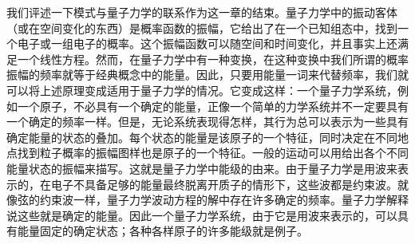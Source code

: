 我们评述一下模式与量子力学的联系作为这一章的结束。量子力学中的振动客体（或在空间变化的东西）是概率函数的振幅，它给出了在一个已知组态中，找到一个电子或一组电子的概率。这个振幅函数可以随空间和时间变化，并且事实上还满足一个线性方程。然而，在量子力学中有一种变换，在这种变换中我们所谓的概率振幅的频率就等于经典概念中的能量。因此，只要用能量一词来代替频率，我们就可以将上述原理变成适用于量子力学的情况。它变成这样：一个量子力学系统，例如一个原子，不必具有一个确定的能量，正像一个简单的力学系统并不一定要具有一个确定的频率一样。但是，无论系统表现得怎样，其行为总可以表示为一些具有确定能量的状态的叠加。每个状态的能量是该原子的一个特征，同时决定在不同地点找到粒子概率的振幅图样也是原子的一个特征。一般的运动可以用给出各个不同能量状态的振幅来描写。这就是量子力学中能级的由来。由于量子力学是用波来表示的，在电子不具备足够的能量最终脱离开质子的情形下，这些波都是约束波。就像弦的约束波一样，量子力学波动方程的解中存在许多确定的频率。量子力学解释说这些就是确定的能量。因此一个量子力学系统，由于它是用波来表示的，可以具有能量固定的确定状态；各种各样原子的许多能级就是例子。